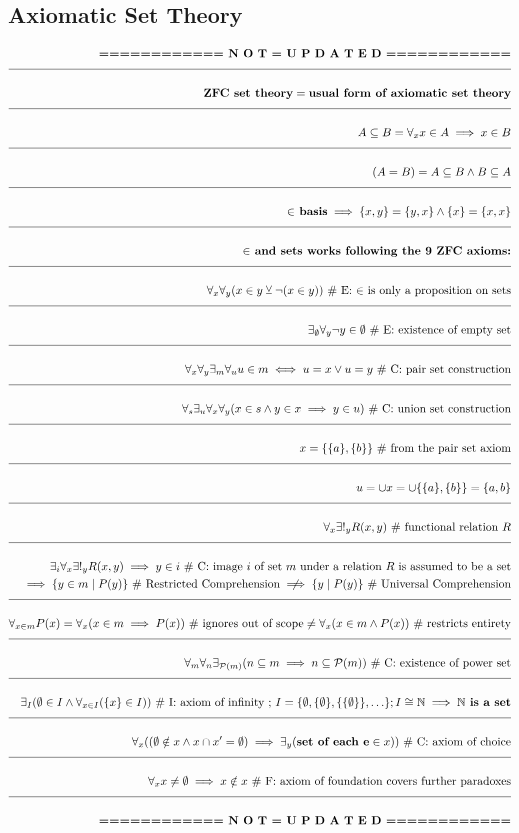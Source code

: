 \documentclass[a4paper]{article}
\def\ml{\mleft}
\def\mr{\mright}
\newcommand{\melazy}{\textbf{============ N O T = U P D A T E D ============}}
\newcommand{\eqComment}[1]{\text{  \# #1}}
\newcommand{\eqSep}{\text{ ;  }}
\newcommand{\n}{\\[1.5ex] \hline \nonumber \\[0ex]}
\newcommand{\m}{\nonumber \\}
\begin{document}
\subsection{Axiomatic Set Theory}
\begin{tcolorbox}
\begin{align}
   \melazy
\n \textbf{ZFC set theory} = \textbf{usual form of axiomatic set theory}
\n A \subseteq B = \forall_x x \in A \implies x \in B
\n \ml(A = B\mr) = A \subseteq B \land B \subseteq A
\n \textbf{$\in$ basis} \implies \{x, y\} = \{y, x\} \land \{x\} = \{x, x\}
\n \textbf{$\in$ and sets works following the 9 ZFC axioms:}
\n \forall_x \forall_y \ml(x \in y \veebar \lnot\ml(x \in y\mr)\mr) \eqComment{E: $\in$ is only a proposition on sets}
\n \exists_\emptyset \forall_y \lnot y \in \emptyset \eqComment{E: existence of empty set}
\n \forall_x \forall_y \exists_m \forall_u u \in m \iff u = x \lor u = y \eqComment{C: pair set construction}
\n \forall_s \exists_u \forall_x \forall_y \ml(x \in s \land y \in x \implies y \in u\mr) \eqComment{C: union set construction}
\n x = \{\{a\}, \{b\}\} \eqComment{from the pair set axiom}
\n u = \cup x = \cup \{\{a\}, \{b\}\} = \{a, b\}
\n \forall_x \exists!_y R\ml(x,y\mr) \eqComment{functional relation $R$}
\n \exists_i \forall_x \exists!_y R\ml(x,y\mr) \implies y \in i
\eqComment{C: image $i$ of set $m$ under a relation $R$ is assumed to be a set}
\m \implies \{y \in m \mid P\ml(y\mr)\} \eqComment{Restricted Comprehension} \centernot\implies  \{y \mid P\ml(y\mr)\} \eqComment{Universal Comprehension}
\n \forall_{x \in m} P\ml(x\mr) = \forall_x \ml(x \in m \implies P\ml(x\mr)\mr) \eqComment{ignores out of scope} \neq \forall_x \ml(x \in m \land P\ml(x\mr)\mr) \eqComment{restricts entirety}
\n \forall_m \forall_n \exists_{\mathcal{P}\ml(m\mr)} \ml(n \subseteq m \implies n \subseteq \mathcal{P}\ml(m\mr)\mr) \eqComment{C: existence of power set}
\n \exists_I \ml(\emptyset \in I \land \forall_{x \in I} \ml(\{x\} \in I\mr)\mr) \eqComment{I: axiom of infinity} \eqSep I = \{\emptyset, \{\emptyset\}, \{\{\emptyset\}\}, \ldots\} ; I \cong \mathbb{N} \implies \textbf{$\mathbb{N}$ is a set}
\n \forall_x \ml(\ml(\emptyset \notin x \land x \cap x' = \emptyset\mr) \implies \exists_y \ml(\textbf{set of each e} \in x\mr)\mr) \eqComment{C: axiom of choice}
\n \forall_x x \neq \emptyset \implies x \notin x \eqComment{F: axiom of foundation covers further paradoxes}
\n \melazy
\end{align}
\end{tcolorbox}
\end{document}
